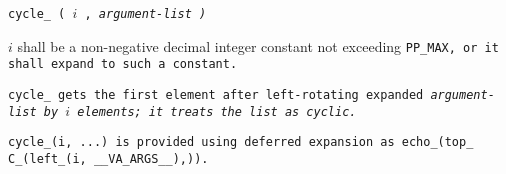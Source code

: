 
\tt{cycle_ (} $i$ \tt{,} \it{argument-list} \tt{)}


$i$ shall be a non-negative decimal integer constant not exceeding \tt{PP_MAX},
or it shall expand to such a constant.


\tt{cycle_} gets the first element after left-rotating expanded
\it{argument-list} by $i$ elements; it treats the list as cyclic.

\note \tt{cycle_(i, ...)} is provided using deferred
expansion as \tt{echo_(top_ C_(left_(i, __VA_ARGS__),))}.
